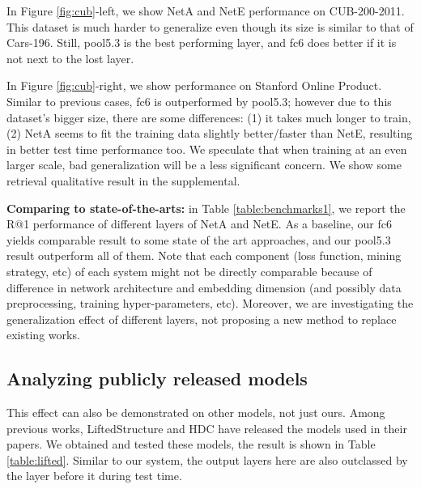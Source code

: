 \documentclass[10pt,twocolumn,letterpaper]{article}
\begin{document}
In Figure \ref{fig:cub}-left, we show NetA and NetE performance on CUB-200-2011. This dataset is much harder to generalize even though its size is similar to that of Cars-196. Still, pool5.3 is the best performing layer, and fc6 does better if it is not next to the lost layer.

In Figure \ref{fig:cub}-right, we show performance on Stanford Online Product. Similar to previous cases, fc6 is outperformed by pool5.3; however due to this dataset's bigger size, there are some differences: (1) it takes much longer to train, (2) NetA seems to fit the training data slightly better/faster than NetE, resulting in better test time performance too. We speculate that when training at an even larger scale, bad generalization will be a less significant concern. We show some retrieval qualitative result in the supplemental.

\textbf{Comparing to state-of-the-arts:} in Table \ref{table:benchmarks1}, we report the R@1 performance of different layers of NetA and NetE. As a baseline, our fc6 yields comparable result to some state of the art approaches, and our pool5.3 result outperform all of them. Note that each component (loss function, mining strategy, etc) of each system might not be directly comparable because of difference in network architecture and embedding dimension (and possibly data preprocessing, training hyper-parameters, etc). Moreover, we are investigating the generalization effect of different layers, not proposing a new method to replace existing works.






  
\subsection{Analyzing publicly released models}


This effect can also be demonstrated on other models, not just ours. Among previous works, LiftedStructure \cite{oh2016deep} and HDC \cite{yuan2016hard} have released the models used in their papers. We obtained and tested these models, the result is shown in Table \ref{table:lifted}. Similar to our system, the output layers here are also outclassed by the layer before it during test time.
\end{document}
